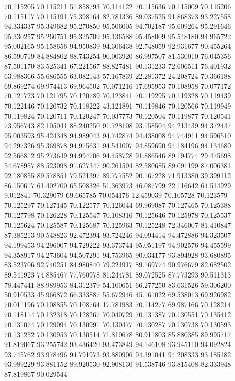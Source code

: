 70.115205
70.115211
51.858793
70.114122
70.115636
70.115009
70.115206
70.115117
70.115191
75.398164
82.781336
89.037525
91.868373
93.227558
94.334337
95.349682
95.270850
95.506005
94.702187
95.609264
95.291646
95.330257
95.260751
95.325709
95.136588
95.458009
95.548180
94.965722
95.002165
95.158656
94.950839
94.306438
92.748059
92.931677
90.455264
86.590719
84.884802
88.743254
90.003920
86.997507
81.530010
76.045356
87.501170
83.525341
67.221567
88.827481
90.131233
72.606511
76.401932
63.988366
55.686555
63.082143
57.167839
22.281372
24.208724
70.366188
69.869274
69.974413
69.964502
70.071216
17.695953
70.108958
70.077172
70.121723
70.121795
70.120789
70.123841
70.119295
70.119328
70.119439
70.122146
70.120732
70.118222
43.121891
70.119846
70.120566
70.119949
70.119824
70.120711
70.120247
70.037773
70.120504
70.119877
70.120541
73.956743
82.105041
88.240250
91.728108
93.158504
94.213439
94.372447
95.003593
95.424348
94.989043
94.742874
94.438008
94.744911
94.596510
94.297326
95.369878
94.975631
94.541007
94.859690
94.184196
94.134680
92.566812
95.273649
94.994706
94.458728
91.886546
89.194774
29.475698
54.678957
88.523098
91.627347
90.261594
82.580685
89.091199
87.006381
92.180855
89.578851
79.521397
89.777552
90.167228
71.913380
39.399112
86.150617
61.402700
65.508326
51.363973
46.087799
22.116642
64.514929
9.012841
70.329079
69.665785
70.054176
12.459039
70.105728
70.123579
70.125297
70.127145
70.122577
70.126044
69.969087
70.127465
70.125388
70.127798
70.126228
70.125547
70.108316
70.125646
70.125978
70.125537
70.125624
70.125587
70.125687
70.125963
70.125248
72.346007
81.410847
87.385213
90.548823
92.472394
93.724246
94.094414
94.472886
94.323507
94.199453
94.296007
94.729222
93.373744
95.051197
94.902576
94.455599
94.358917
94.273604
94.507291
94.753965
90.034177
93.894928
93.680895
83.523706
92.740251
84.980840
79.221917
89.169774
90.976679
82.682502
89.541923
74.885467
77.760978
81.244781
89.072525
87.773293
90.511313
78.447441
88.989953
84.312379
54.100651
66.277250
83.631526
59.306200
50.910533
45.966872
66.333887
55.672946
45.161022
69.538013
69.926982
70.011196
70.108855
70.108764
17.781983
70.114277
69.987166
70.128214
70.118114
70.132318
70.128267
70.040729
70.131387
70.130551
70.135412
70.131074
70.129094
70.130991
70.130477
70.130287
70.130738
70.130593
70.131252
70.130953
70.130514
71.810678
80.911803
85.880385
89.995717
91.819067
93.255742
93.436420
93.473849
94.146108
93.945110
94.092824
93.745762
93.978496
94.791973
93.880906
94.391041
94.208333
93.185182
93.989229
93.881152
89.920530
92.908130
91.538746
93.815408
82.333948
87.819867
90.029544
